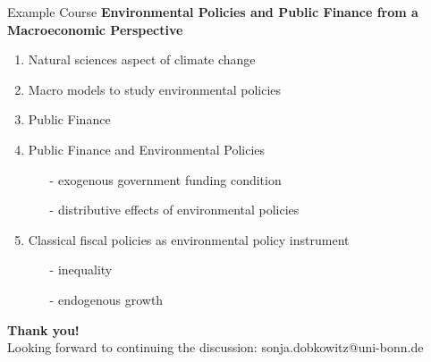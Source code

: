 \begin{frame}{Example Course}
	\vspace{-2mm}
\alert{\textbf{Environmental Policies and Public Finance from a Macroeconomic Perspective}}
	\pause
\begin{enumerate}[<+->]
	\item Natural sciences aspect of climate change \footnotesize{\citep{Hassler2016EnvironmentalMacroeconomics, Hsiang2018AnScience}} \normalsize
	\item Macro models to study environmental policies \\ \footnotesize{\citep{Acemoglu2012TheChange, Golosov2014OptimalEquilibrium, Acemoglu2016TransitionTechnology, Fried2018ClimateAnalysis}} \normalsize
	\item Public Finance \footnotesize{\citep{ Domeij2004OnTaxes, Conesa2009TaxingAll, Heathcote2017OptimalFramework}} \normalsize
	\item Public Finance and Environmental Policies
	\begin{itemize}
		\item[-] exogenous government funding condition \\ \footnotesize{\citep{LansBovenberg1994EnvironmentalTaxation, Goulder1995EnvironmentalGuide, Barrage2019OptimalPolicy}}
		\item[-] distributive effects of environmental policies \\ \footnotesize{\citep{Fried2018TheGenerations, Goulder2019IncomeGroups, Kotlikoff2021MakingWin}}
	\end{itemize}
\item Classical fiscal policies as environmental policy instrument
\begin{itemize}
		\item[-] inequality \footnotesize{\citep{Jacobs2019RedistributionCurves, Dobkowitz2022, Douenne2022OptimalHouseholds}} \normalsize
		\item[-] endogenous growth \footnotesize{\citep{Dobkowitz2022}}
\end{itemize}
\end{enumerate}
\end{frame}


\begin{frame}
	\hypertarget{end}{}
	\huge \textbf{Thank you!} \\
	\vspace{5mm}
	\normalsize
	{Looking forward to continuing the discussion: \alert{sonja.dobkowitz@uni-bonn.de}}
\end{frame}


